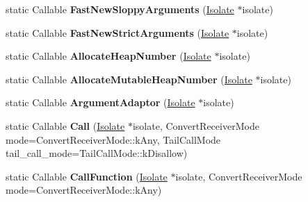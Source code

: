 \begin{DoxyCompactItemize}
\item 
static Callable {\bfseries Fast\+New\+Sloppy\+Arguments} (\hyperlink{classv8_1_1internal_1_1_isolate}{Isolate} $\ast$isolate)\hypertarget{classv8_1_1internal_1_1_code_factory_abd185b7bd2e9c7bb33378bda3c907e52}{}\label{classv8_1_1internal_1_1_code_factory_abd185b7bd2e9c7bb33378bda3c907e52}

\item 
static Callable {\bfseries Fast\+New\+Strict\+Arguments} (\hyperlink{classv8_1_1internal_1_1_isolate}{Isolate} $\ast$isolate)\hypertarget{classv8_1_1internal_1_1_code_factory_af3e7ff2e3b187ca41a60b6a6879dc411}{}\label{classv8_1_1internal_1_1_code_factory_af3e7ff2e3b187ca41a60b6a6879dc411}

\item 
static Callable {\bfseries Allocate\+Heap\+Number} (\hyperlink{classv8_1_1internal_1_1_isolate}{Isolate} $\ast$isolate)\hypertarget{classv8_1_1internal_1_1_code_factory_a6cfc13b2094fb215051f9126c334e828}{}\label{classv8_1_1internal_1_1_code_factory_a6cfc13b2094fb215051f9126c334e828}

\item 
static Callable {\bfseries Allocate\+Mutable\+Heap\+Number} (\hyperlink{classv8_1_1internal_1_1_isolate}{Isolate} $\ast$isolate)\hypertarget{classv8_1_1internal_1_1_code_factory_a605043739e6ea14b1f52e1ea0d6390cd}{}\label{classv8_1_1internal_1_1_code_factory_a605043739e6ea14b1f52e1ea0d6390cd}

\item 
static Callable {\bfseries Argument\+Adaptor} (\hyperlink{classv8_1_1internal_1_1_isolate}{Isolate} $\ast$isolate)\hypertarget{classv8_1_1internal_1_1_code_factory_ab4b1f2ca90d6b333e42fc0a9bb1755df}{}\label{classv8_1_1internal_1_1_code_factory_ab4b1f2ca90d6b333e42fc0a9bb1755df}

\item 
static Callable {\bfseries Call} (\hyperlink{classv8_1_1internal_1_1_isolate}{Isolate} $\ast$isolate, Convert\+Receiver\+Mode mode=Convert\+Receiver\+Mode\+::k\+Any, Tail\+Call\+Mode tail\+\_\+call\+\_\+mode=Tail\+Call\+Mode\+::k\+Disallow)\hypertarget{classv8_1_1internal_1_1_code_factory_af5cd0cc5c5c30ce259f97fe00d069604}{}\label{classv8_1_1internal_1_1_code_factory_af5cd0cc5c5c30ce259f97fe00d069604}

\item 
static Callable {\bfseries Call\+Function} (\hyperlink{classv8_1_1internal_1_1_isolate}{Isolate} $\ast$isolate, Convert\+Receiver\+Mode mode=Convert\+Receiver\+Mode\+::k\+Any)\hypertarget{classv8_1_1internal_1_1_code_factory_acbf0b2d4f5722612dc2be19385d2e619}{}\label{classv8_1_1internal_1_1_code_factory_acbf0b2d4f5722612dc2be19385d2e619}


\end{DoxyCompactItemize}
